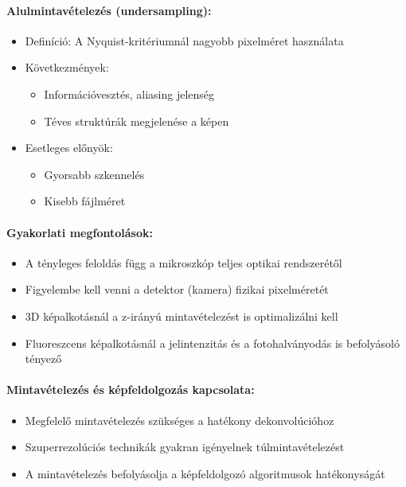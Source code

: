 \documentclass[a4paper,12pt]{article}
\begin{document}
\paragraph{Alulmintavételezés (undersampling):} \begin{itemize} \item Definíció: A Nyquist-kritériumnál nagyobb pixelméret használata \item Következmények: \begin{itemize} \item Információvesztés, aliasing jelenség \item Téves struktúrák megjelenése a képen \end{itemize} \item Esetleges előnyök: \begin{itemize} \item Gyorsabb szkennelés \item Kisebb fájlméret \end{itemize} \end{itemize}

\paragraph{Gyakorlati megfontolások:} \begin{itemize} \item A tényleges feloldás függ a mikroszkóp teljes optikai rendszerétől \item Figyelembe kell venni a detektor (kamera) fizikai pixelméretét \item 3D képalkotásnál a z-irányú mintavételezést is optimalizálni kell \item Fluoreszcens képalkotásnál a jelintenzitás és a fotohalványodás is befolyásoló tényező \end{itemize}

\paragraph{Mintavételezés és képfeldolgozás kapcsolata:} \begin{itemize} \item Megfelelő mintavételezés szükséges a hatékony dekonvolúcióhoz \item Szuperrezolúciós technikák gyakran igényelnek túlmintavételezést \item A mintavételezés befolyásolja a képfeldolgozó algoritmusok hatékonyságát \end{itemize}
\end{document}
